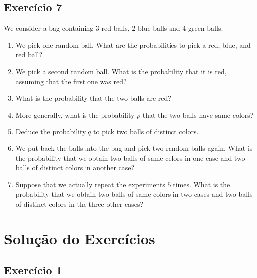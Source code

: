 \subsection*{Exercício 7}

We consider a bag containing $3$ red balls, $2$ blue balls and $4$ green balls.

\begin{enumerate}
\item We pick one random ball.
  What are the probabilities to pick a red, blue, and red
  ball?
\item We pick a second random ball.
  What is the probability that it is red, assuming
  that the first one was red?
\item What is the probability that the two balls are red?
\item More generally, what is the probability $p$ that the two balls have same
  colors?
\item Deduce the probability $q$ to pick two balls of distinct colors.
\item We put back the balls into the bag and pick two random balls again.
  What is the probability that we obtain two balls of same colors
  in one case and two balls of distinct colors in another case?
\item Suppose that we actually repeat the experiments $5$ times.
  What is the probability that we obtain two balls of same colors
  in two cases and two balls of distinct colors in the three other cases?
\end{enumerate}

\section{Solução do Exercícios}

\subsection*{Exercício 1}

